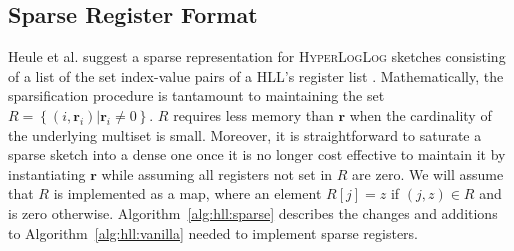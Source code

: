 \documentclass[10]{report}
\newcommand{\algoname}[1]{\textnormal{\textsc{#1}}}
\begin{document}
\subsection{Sparse Register Format}
 \label{DS:sec:HLL:sparse}


Heule et al. suggest a sparse representation for \algoname{HyperLogLog} sketches consisting of a list of the set index-value pairs of a \algoname{HLL}'s register list \cite{heule2013hyperloglog}.
Mathematically, the sparsification procedure is tantamount to maintaining the set $R = \left \{(i, \mathbf{r}_i) | \mathbf{r}_i \neq 0 \right \}$.
$R$ requires less memory than $\mathbf{r}$ when the cardinality of the underlying multiset is small. 
Moreover, it is straightforward to saturate a sparse sketch into a dense one once it is no longer cost effective to maintain it by instantiating $\mathbf{r}$ while assuming all registers not set in $R$ are zero. 
We will assume that $R$ is implemented as a map, where an element $R[j] = z$ if $(j, z) \in R$ and is zero otherwise.
Algorithm~\ref{alg:hll:sparse} describes the changes and additions to Algorithm~\ref{alg:hll:vanilla} needed to implement sparse registers.
\end{document}
